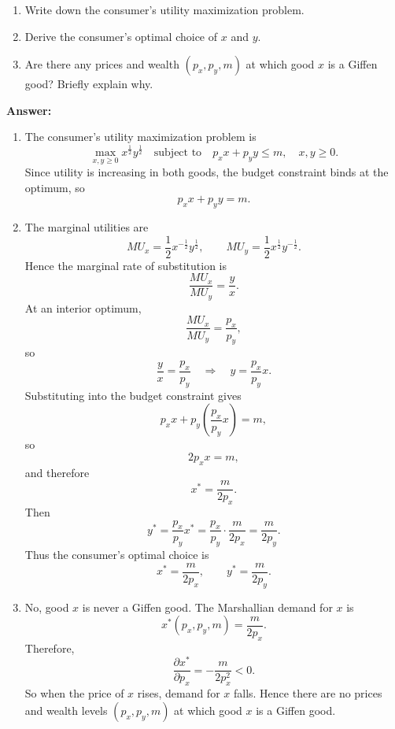 \documentclass[12pt,a4paper]{article}
\begin{document}
\begin{enumerate}
  \item Write down the consumer's utility maximization problem.
  \item Derive the consumer's optimal choice of $x$ and $y$.
  \item Are there any prices and wealth $(p_x, p_y, m)$ at which good $x$ is a Giffen good? Briefly explain why.
\end{enumerate}

\vspace{0.5cm}

\noindent\textbf{Answer:}

\begin{enumerate}
  \item The consumer's utility maximization problem is
  \[
    \max_{x,y\ge 0} x^{\frac{1}{2}} y^{\frac{1}{2}}
    \quad \text{subject to} \quad
    p_x x + p_y y \le m, \quad x,y\ge0.
  \]
  Since utility is increasing in both goods, the budget constraint binds at the optimum, so
  \[
    p_x x + p_y y = m.
  \]

  \item The marginal utilities are
  \[
    MU_x = \frac{1}{2}x^{-\frac{1}{2}}y^{\frac{1}{2}},
    \qquad
    MU_y = \frac{1}{2}x^{\frac{1}{2}}y^{-\frac{1}{2}}.
  \]
  Hence the marginal rate of substitution is
  \[
    \frac{MU_x}{MU_y} = \frac{y}{x}.
  \]
  At an interior optimum,
  \[
    \frac{MU_x}{MU_y} = \frac{p_x}{p_y},
  \]
  so
  \[
    \frac{y}{x} = \frac{p_x}{p_y}
    \quad \Rightarrow \quad
    y = \frac{p_x}{p_y}x.
  \]
  Substituting into the budget constraint gives
  \[
    p_x x + p_y\left(\frac{p_x}{p_y}x\right) = m,
  \]
  so
  \[
    2p_x x = m,
  \]
  and therefore
  \[
    x^* = \frac{m}{2p_x}.
  \]
  Then
  \[
    y^* = \frac{p_x}{p_y}x^*
    = \frac{p_x}{p_y}\cdot \frac{m}{2p_x}
    = \frac{m}{2p_y}.
  \]
  Thus the consumer's optimal choice is
  \[
    x^* = \frac{m}{2p_x},
    \qquad
    y^* = \frac{m}{2p_y}.
  \]

  \item No, good $x$ is never a Giffen good. The Marshallian demand for $x$ is
  \[
    x^*(p_x,p_y,m) = \frac{m}{2p_x}.
  \]
  Therefore,
  \[
    \frac{\partial x^*}{\partial p_x}
    = -\frac{m}{2p_x^2} < 0.
  \]
  So when the price of $x$ rises, demand for $x$ falls. Hence there are no prices and wealth levels $(p_x,p_y,m)$ at which good $x$ is a Giffen good.
\end{enumerate}

\end{document}
